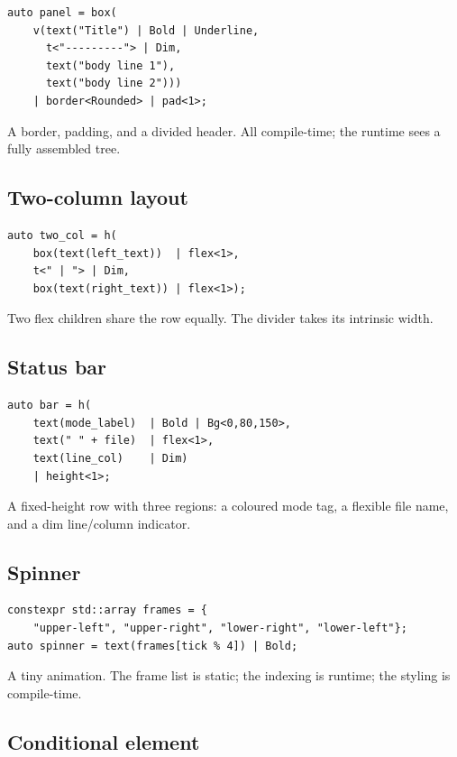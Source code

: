 \begin{lstlisting}
auto panel = box(
    v(text("Title") | Bold | Underline,
      t<"---------"> | Dim,
      text("body line 1"),
      text("body line 2")))
    | border<Rounded> | pad<1>;
\end{lstlisting}

A border, padding, and a divided header. All compile-time; the
runtime sees a fully assembled tree.

\subsection*{Two-column layout}

\begin{lstlisting}
auto two_col = h(
    box(text(left_text))  | flex<1>,
    t<" | "> | Dim,
    box(text(right_text)) | flex<1>);
\end{lstlisting}

Two flex children share the row equally. The divider takes its
intrinsic width.

\subsection*{Status bar}

\begin{lstlisting}
auto bar = h(
    text(mode_label)  | Bold | Bg<0,80,150>,
    text(" " + file)  | flex<1>,
    text(line_col)    | Dim)
    | height<1>;
\end{lstlisting}

A fixed-height row with three regions: a coloured mode tag, a
flexible file name, and a dim line/column indicator.

\subsection*{Spinner}

\begin{lstlisting}
constexpr std::array frames = {
    "upper-left", "upper-right", "lower-right", "lower-left"};
auto spinner = text(frames[tick % 4]) | Bold;
\end{lstlisting}

A tiny animation. The frame list is static; the indexing is
runtime; the styling is compile-time.

\subsection*{Conditional element}

